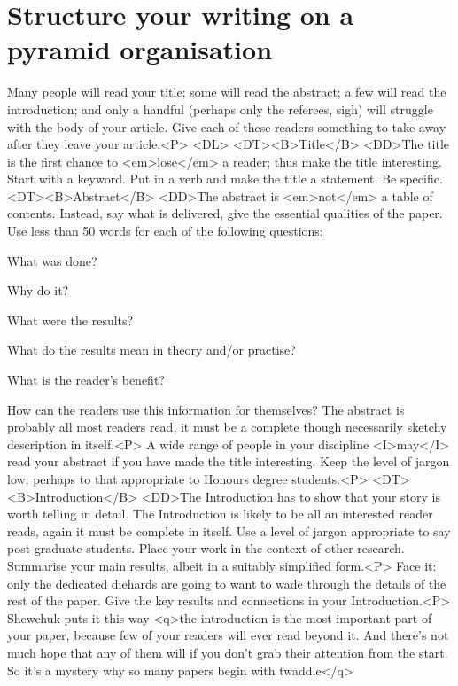 \documentclass[a5paper]{report}
\begin{document}
{\section{Structure your writing on a pyramid organisation}
Many people will read your title; some will read the abstract; a few will 
read the introduction; and only a handful (perhaps only the referees, sigh) 
will struggle with the body of your article.  Give each of these readers 
something to take away after they leave your article.<P>
<DL>
<DT><B>Title</B>
<DD>The title is the first chance to <em>lose</em> a reader; thus make 
the title
interesting.  Start with a keyword. Put in a verb and make the title a statement.  
Be specific.
<DT><B>Abstract</B>
<DD>The abstract is <em>not</em> a table of contents.  Instead, say
what is delivered, give the essential qualities of the paper.  Use less than
50 words for each of the following questions:
\itemize 
\item What was done?
\item Why do it?
\item What were the results?
\item What do the results mean in theory and/or practise?
\item What is the reader's benefit?
\item How can the readers use this information for themselves?
\enditemize 
The abstract is probably all most readers read, it must be a complete 
though necessarily sketchy description in itself.<P>
A wide range of people in your discipline <I>may</I> read your abstract if 
you have made the title interesting.  Keep the level of jargon low, perhaps 
to that appropriate to Honours degree students.<P>
<DT><B>Introduction</B>
<DD>The Introduction has to show that your story is worth telling in 
detail.  The Introduction is likely to be all an interested reader reads, 
again it must be complete in itself.  Use a level of jargon appropriate to say 
post-graduate students.  Place your work in the context of other research.  
Summarise your main results, albeit in a suitably simplified form.<P>
Face it: only the dedicated diehards are going to want to wade through 
the details of the rest of the paper.  Give the key results and
connections in your 
Introduction.<P>
Shewchuk puts it this way <q>the introduction is the most important
part of your paper, because few of your readers will ever read beyond
it.  And there's not much hope that any of them will if you don't grab
their attention from the start.  So it's a mystery why so many papers
begin with twaddle</q>
}
\end{document}
